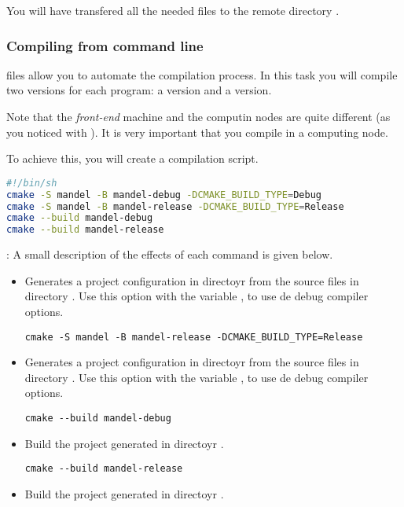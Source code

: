 You will have transfered all the needed files to the remote directory
.

\subsubsection{Compiling from command line}

 files allow you to automate the compilation process.
In this task you will compile two versions for each program:
a  version and a  version.

Note that the \emph{front-end} machine and the computin nodes are quite different
(as you noticed with ).
It is very important that you compile in a computing node.

To achieve this, you will create a compilation script.
\begin{lstlisting}[language=bash,frame=single,title={File: runlscpu.sh}]
#!/bin/sh
cmake -S mandel -B mandel-debug -DCMAKE_BUILD_TYPE=Debug
cmake -S mandel -B mandel-release -DCMAKE_BUILD_TYPE=Release
cmake --build mandel-debug
cmake --build mandel-release 
\end{lstlisting}

: 
A small description of the effects of each command is given below.

\begin{itemize}
\begin{lstlisting}[style=terminal]
cmake -S mandel -B mandel-debug -DCMAKE_BUILD_TYPE=Debug
\end{lstlisting}
  \item Generates a project configuration in directoyr 
        from the source files in directory .
        Use this option with the variable ,
        to use de debug compiler options.

\begin{lstlisting}[style=terminal]
cmake -S mandel -B mandel-release -DCMAKE_BUILD_TYPE=Release
\end{lstlisting}
  \item Generates a project configuration in directoyr 
        from the source files in directory .
        Use this option with the variable ,
        to use de debug compiler options.

\begin{lstlisting}[style=terminal]
cmake --build mandel-debug
\end{lstlisting}
  \item Build the project generated in directoyr .

\begin{lstlisting}[style=terminal]
cmake --build mandel-release
\end{lstlisting}
  \item Build the project generated in directoyr .

\end{itemize}

